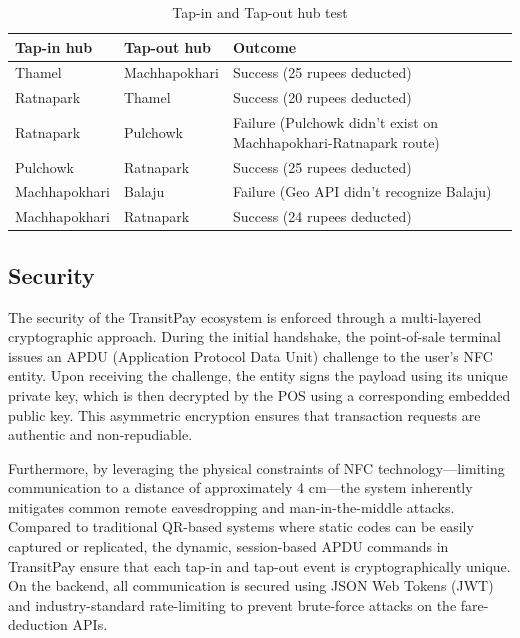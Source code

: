 \documentclass[sigconf, nonacm]{acmart}
\begin{document}
\begin{table}[t]
  \centering
  \caption{Tap-in and Tap-out hub test}
  \label{tab:tapped_in_and_tapped_out}
  \begin{tabularx}{\columnwidth}{>{\RaggedRight\arraybackslash}p{2.5cm} >{\RaggedRight\arraybackslash}X >{\RaggedRight\arraybackslash}X}
    \toprule
    \textbf{Tap-in hub} & \textbf{Tap-out hub} & \textbf{Outcome} \\
    \midrule 
    Thamel & Machhapokhari & Success (25 rupees deducted) \\
    Ratnapark & Thamel & Success (20 rupees deducted) \\
    Ratnapark & Pulchowk & Failure (Pulchowk didn't exist on Machhapokhari-Ratnapark route) \\
    Pulchowk & Ratnapark & Success (25 rupees deducted) \\
    Machhapokhari & Balaju & Failure (Geo API didn't recognize Balaju) \\
    Machhapokhari & Ratnapark & Success (24 rupees deducted) \\
    \bottomrule
  \end{tabularx}
\end{table}


\subsection{Security}

The security of the TransitPay ecosystem is enforced through a multi-layered cryptographic approach. During the initial handshake, the point-of-sale terminal issues an APDU (Application Protocol Data Unit) challenge to the user's NFC entity. Upon receiving the challenge, the entity signs the payload using its unique private key, which is then decrypted by the POS using a corresponding embedded public key. This asymmetric encryption ensures that transaction requests are authentic and non-repudiable. 

Furthermore, by leveraging the physical constraints of NFC technology—limiting communication to a distance of approximately 4 cm—the system inherently mitigates common remote eavesdropping and man-in-the-middle attacks. Compared to traditional QR-based systems where static codes can be easily captured or replicated, the dynamic, session-based APDU commands in TransitPay ensure that each tap-in and tap-out event is cryptographically unique. On the backend, all communication is secured using JSON Web Tokens (JWT) and industry-standard rate-limiting to prevent brute-force attacks on the fare-deduction APIs.
\end{document}
